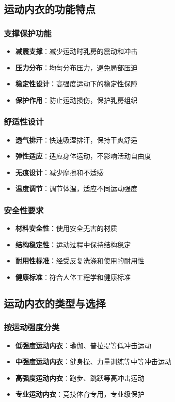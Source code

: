 \documentclass[12pt,UTF8]{ctexbook}
\begin{document}
\subsection{运动内衣的功能特点}
\subsubsection{支撑保护功能}
\begin{itemize}[leftmargin=2cm]
	\item \textbf{减震支撑}：减少运动时乳房的震动和冲击
	\item \textbf{压力分布}：均匀分布压力，避免局部压迫
	\item \textbf{稳定性设计}：高强度运动下的稳定性保障
	\item \textbf{保护作用}：防止运动损伤，保护乳房组织
\end{itemize}

\subsubsection{舒适性设计}
\begin{itemize}[leftmargin=2cm]
	\item \textbf{透气排汗}：快速吸湿排汗，保持干爽舒适
	\item \textbf{弹性适应}：适应身体运动，不影响活动自由度
	\item \textbf{无痕设计}：减少摩擦和不适感
	\item \textbf{温度调节}：调节体温，适应不同运动强度
\end{itemize}

\subsubsection{安全性要求}
\begin{itemize}[leftmargin=2cm]
	\item \textbf{材料安全性}：使用安全无害的材质
	\item \textbf{结构稳定性}：运动过程中保持结构稳定
	\item \textbf{耐用性标准}：经受反复洗涤和使用的耐用性
	\item \textbf{健康标准}：符合人体工程学和健康标准
\end{itemize}

\subsection{运动内衣的类型与选择}
\subsubsection{按运动强度分类}
\begin{itemize}[leftmargin=2cm]
	\item \textbf{低强度运动内衣}：瑜伽、普拉提等低冲击运动
	\item \textbf{中强度运动内衣}：健身操、力量训练等中等冲击运动
	\item \textbf{高强度运动内衣}：跑步、跳跃等高冲击运动
	\item \textbf{专业运动内衣}：竞技体育专用，专业级保护
\end{itemize}
\end{document}
